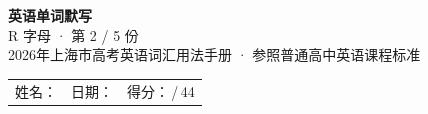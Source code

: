 \documentclass[10pt,a4paper]{article}
\begin{document}
\pagestyle{plain}

\begin{center}
{\LARGE\bfseries 英语单词默写}\\[0.22em]
{\large R 字母 · 第 2 / 5 份}\\[0.18em]
{\small 2026年上海市高考英语词汇用法手册 · 参照普通高中英语课程标准}
\end{center}

\vspace{0.25em}
\noindent\begin{tabular}{@{}p{}@{}p{}@{}p{}@{}}
姓名：\underline{\hspace{2.0cm}} & 日期：\underline{\hspace{2.0cm}} & 得分：\underline{\hspace{1.3cm}}\,/\,44 \\
\end{tabular}

\vspace{0.3em}

\vspace{0.08em}
\end{document}
